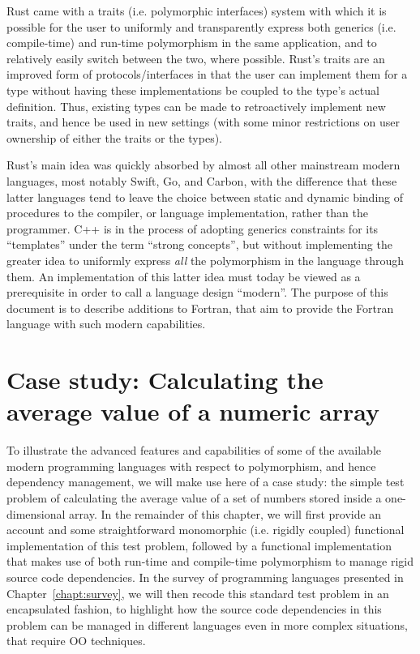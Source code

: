 \documentclass[11pt,oneside]{report}
\begin{document}
Rust came with a traits (i.e. polymorphic interfaces) system with which
it is possible for the user to uniformly and transparently express
both generics (i.e. compile-time) and run-time polymorphism in the
same application, and to relatively easily switch between the two,
where possible. Rust's traits are an improved form of
protocols/interfaces in that the user can implement them for a type
without having these implementations be coupled to the type's actual
definition. Thus, existing types can be made to retroactively
implement new traits, and hence be used in new settings (with some
minor restrictions on user ownership of either the traits or the
types).

Rust's main idea was quickly absorbed by almost all other mainstream
modern languages, most notably Swift, Go, and Carbon, with the
difference that these latter languages tend to leave the choice
between static and dynamic binding of procedures to the compiler, or
language implementation, rather than the programmer. C++ is in the
process of adopting generics constraints for its ``templates'' under
the term ``strong concepts'', but without implementing the greater
idea to uniformly express \emph{all} the polymorphism in the language
through them. An implementation of this latter idea must today be
viewed as a prerequisite in order to call a language design
``modern''. The purpose of this document is to describe additions to
Fortran, that aim to provide the Fortran language with such modern
capabilities.

\chapter{Case study: Calculating the average value of a numeric array}

To illustrate the advanced features and capabilities of some of the
available modern programming languages with respect to polymorphism,
and hence dependency management, we will make use here of a case
study: the simple test problem of calculating the average value of a
set of numbers stored inside a one-dimensional array. In the remainder
of this chapter, we will first provide an account and some
straightforward monomorphic (i.e. rigidly coupled) functional
implementation of this test problem, followed by a functional
implementation that makes use of both run-time and compile-time
polymorphism to manage rigid source code dependencies. In the survey
of programming languages presented in Chapter~\ref{chapt:survey}, we
will then recode this standard test problem in an encapsulated
fashion, to highlight how the source code dependencies in this problem
can be managed in different languages even in more complex situations,
that require OO techniques.
\end{document}
